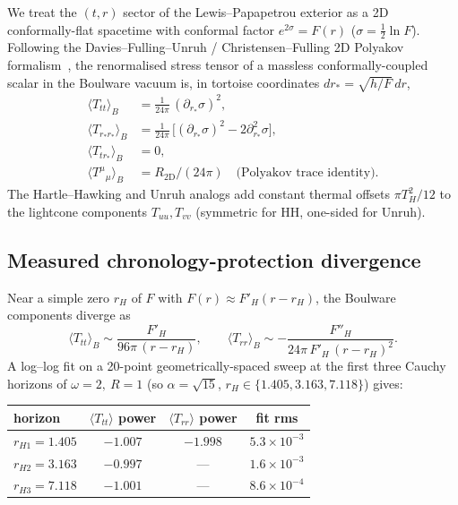 \documentclass[11pt,a4paper]{article}
\begin{document}
We treat the $(t, r)$ sector of the Lewis--Papapetrou exterior as a
2D conformally-flat spacetime with conformal factor
$e^{2\sigma} = F(r)$ ($\sigma = \tfrac{1}{2}\ln F$). Following the
Davies--Fulling--Unruh / Christensen--Fulling 2D Polyakov
formalism~\cite{Davies1976,Christensen1977,BirrellDavies1982}, the
renormalised stress tensor of a massless conformally-coupled scalar
in the Boulware vacuum is, in tortoise coordinates
$dr_* = \sqrt{h/F}\, dr$,
\begin{align}
\langle T_{tt} \rangle_{B}        &= \frac{1}{24\pi}\, (\partial_{r_*} \sigma)^2, \\
\langle T_{r_* r_*} \rangle_{B}   &= \frac{1}{24\pi}\, \bigl[ (\partial_{r_*} \sigma)^2 - 2 \partial_{r_*}^2 \sigma \bigr], \\
\langle T_{t r_*} \rangle_{B}     &= 0, \\
\langle T^\mu{}_\mu \rangle_{B}   &= R_{\text{2D}} / (24 \pi) \quad \text{(Polyakov trace identity).}
\end{align}
The Hartle--Hawking and Unruh analogs add constant thermal offsets
$\pi T_H^2 / 12$ to the lightcone components $T_{uu}, T_{vv}$
(symmetric for HH, one-sided for Unruh).

\subsection{Measured chronology-protection divergence}

Near a simple zero $r_H$ of $F$ with $F(r) \approx F'_H (r - r_H)$,
the Boulware components diverge as
\begin{equation}
\langle T_{tt} \rangle_B \sim \frac{F'_H}{96 \pi\, (r - r_H)}, \qquad
\langle T_{rr} \rangle_B \sim -\frac{F''_H}{24 \pi\, F'_H\, (r - r_H)^2}.
\end{equation}
A log--log fit on a 20-point geometrically-spaced sweep at the first
three Cauchy horizons of $\omega = 2,\ R = 1$ (so $\alpha = \sqrt{15}$,
$r_H \in \{1.405, 3.163, 7.118\}$) gives:

\begin{center}
\begin{tabular}{lccc}
\toprule
horizon       & $\langle T_{tt}\rangle$ power & $\langle T_{rr}\rangle$ power & fit rms \\
\midrule
$r_{H1}=1.405$ & $-1.007$ & $-1.998$ & $5.3 \times 10^{-3}$ \\
$r_{H2}=3.163$ & $-0.997$ &     ---  & $1.6 \times 10^{-3}$ \\
$r_{H3}=7.118$ & $-1.001$ &     ---  & $8.6 \times 10^{-4}$ \\
\bottomrule
\end{tabular}
\end{center}
\end{document}
